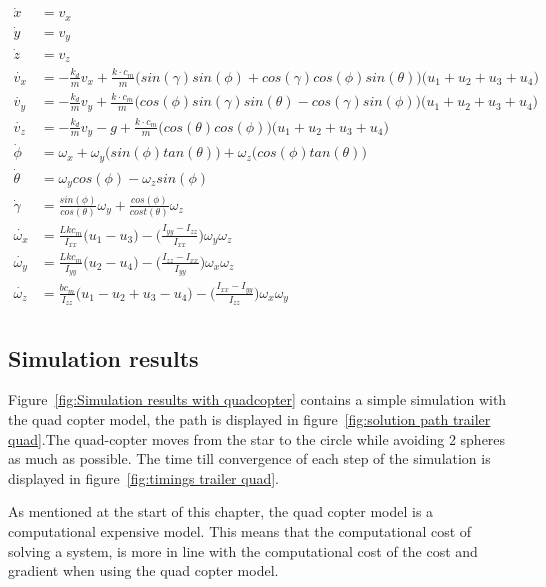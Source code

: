 \begin{equation}
	\begin{aligned}
		\dot{x} &= v_x \\
		\dot{y} &= v_y \\
		\dot{z} &= v_z \\
		\dot{v_x} &= -\frac{k_d}{m}v_x + \frac{k \cdot c_m}{m}\Big(sin(\gamma)sin(\phi)+cos(\gamma)cos(\phi)sin(\theta)\Big)\Big(u_1 + u_2 + u_3 + u_4\Big) \\
		\dot{v_y} &= -\frac{k_d}{m}v_y + \frac{k \cdot c_m}{m}\Big(cos(\phi)sin(\gamma)sin(\theta)-cos(\gamma)sin(\phi)\Big)\Big(u_1 + u_2 + u_3 + u_4\Big) \\
		\dot{v_z} &= -\frac{k_d}{m}v_y -g + \frac{k \cdot c_m}{m}\Big(cos(\theta)cos(\phi)\Big)\Big(u_1 + u_2 + u_3 + u_4\Big) \\
		\dot{\phi} &= \omega_x + \omega_y\Big( sin(\phi)tan(\theta) \Big) + \omega_z \Big( cos(\phi) tan(\theta) \Big) \\
		\dot{\theta} &= \omega_y cos(\phi) - \omega_z sin(\phi) \\
		\dot{\gamma} &= \frac{sin(\phi)}{cos(\theta)}\omega_y + \frac{cos(\phi)}{cost(\theta)} \omega_z \\
		\dot{\omega_x} &= \frac{Lkc_m}{I_{xx}}\Big( u_1 - u_3 \Big) - \Big( \frac{I_{yy}-I_{zz}}{I_{xx}} \Big) \omega_y \omega_z\\
		\dot{\omega_y} &= \frac{Lkc_m}{I_{yy}}\Big( u_2 - u_4 \Big) - \Big( \frac{I_{zz}-I_{xx}}{I_{yy}} \Big) \omega_x \omega_z\\
		\dot{\omega_z} &= \frac{bc_m}{I_{zz}}\Big( u_1 - u_2 + u_3 - u_4 \Big) - \Big( \frac{I_{xx}-I_{yy}}{I_{zz}} \Big) \omega_x \omega_y\\
	\end{aligned}
	\label{eq:mathematical model quadcopter}
\end{equation}

\subsection{Simulation results}
Figure~\ref{fig:Simulation results with quadcopter} contains a simple simulation with the quad copter model, the path is displayed in figure~\ref{fig:solution path trailer quad}.The quad-copter moves from the star to the circle while avoiding 2 spheres as much as possible. The time till convergence of each step of the simulation is displayed in figure~\ref{fig:timings trailer quad}.

As mentioned at the start of this chapter, the quad copter model is a computational expensive model. This means that the computational cost of solving a system, is more in line with the computational cost of the cost and gradient when using the quad copter model.

